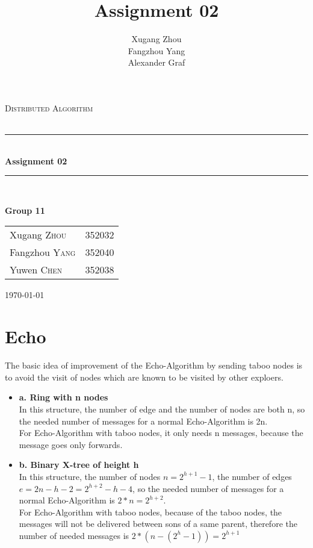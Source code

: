 \documentclass[a4paper, 14pt]{article}
\title{\bf Assignment 02}
\author{Xugang Zhou \\ Fangzhou Yang \\ Alexander Graf}
\newcommand{\HRule}{\rule{\linewidth}{0.5mm}}
\begin{document}
\begin{titlepage}
\begin{center}
\vfill
\textsc{\LARGE Distributed Algorithm}\\[1.5cm]
\textsc{\Large }\\[0.5cm]

\HRule \\[0.4cm]
{\huge \bfseries Assignment 02}\\[0.4cm]
\HRule \\[1.5cm]
\begin{minipage}{0.4\textwidth}
\begin{flushleft} \large
\large{\textbf{Group 11}}
\end{flushleft}
\end{minipage}
\begin{minipage}{0.4\textwidth}
\begin{flushright} \large
\begin{tabular}{ll}
Xugang \textsc{Zhou} & 352032\\
Fangzhou \textsc{Yang} & 352040\\
Yuwen \textsc{Chen} & 352038
\end{tabular}
\end{flushright}
\end{minipage}
\vfill
{\large \today}\\
\end{center}
\end{titlepage}
\thispagestyle{fancy}

\section{Echo}
The basic idea of improvement of the Echo-Algorithm by sending taboo nodes is to avoid the visit of nodes which are known to be visited by other exploers.
\begin {itemize}
\item {\bf a. Ring with n nodes} \\
In this structure, the number of edge and the number of nodes are both n, so the needed number of messages for a normal Echo-Algorithm is 2n. \\
For Echo-Algorithm with taboo nodes, it only needs n messages, because the message goes only forwards.
\item {\bf b. Binary X-tree of height h}\\
In this structure, the number of nodes $n = 2^{h+1} - 1$, the number of edges $e = 2n - h -2 = 2^{h+2} - h -4$, so the needed number of messages for a normal Echo-Algorithm is $2*n = 2^{h+2}$.\\
For Echo-Algorithm with taboo nodes, because of the taboo nodes, the messages will not be delivered between sons of a same parent, therefore the number of needed messages is $2*(n - (2^{h} -1)) = 2^{h+1}$
\end {itemize}
\end{document}
